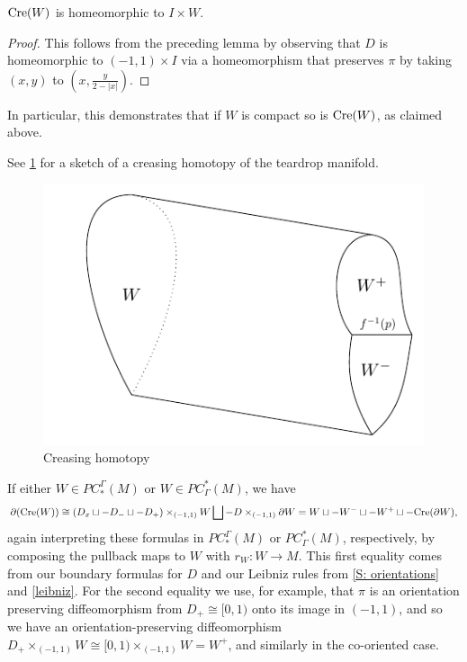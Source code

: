 \begin{corollary}
$\mathrm{Cre}(W)$ is homeomorphic to $I \times W$.
\end{corollary}
\begin{proof}
This follows from the preceding lemma by observing that $D$ is homeomorphic to $(-1,1) \times I$ via a homeomorphism that preserves $\pi$ by taking $(x,y)$ to $\left(x, \frac{y}{2-|x|}\right)$.
\end{proof}

In particular, this demonstrates that if $W$ is compact so is $\mathrm{Cre}(W)$, as claimed above.

See \cref{F: creasing} for a sketch of a creasing homotopy of the teardrop manifold.

\begin{figure}
	\includegraphics{figures/creasing2.pdf}
	\caption{Creasing homotopy}
	\label{F: creasing}
\end{figure}

If either $W \in PC^\Gamma_*(M)$ or $W \in PC_\Gamma^*(M)$, we have
\begin{equation}\label{E: bd crease}
\partial(\mathrm{Cre}(W))\cong(D_x \sqcup -D_- \sqcup -D_+)\times_{(-1,1)} W \bigsqcup -D\times_{(-1,1)}\partial W = W \sqcup -W^- \sqcup -W^+ \sqcup -\mathrm{Cre}(\partial W),
\end{equation}
again interpreting these formulas in $PC^\Gamma_*(M)$ or $PC_\Gamma^*(M)$, respectively, by composing the pullback maps to $W$ with $r_W \colon W \to M$. This first equality comes from our boundary formulas for $D$ and our Leibniz rules from \cref{S: orientations} and \cref{leibniz}. For the second equality we use, for example, that $\pi$ is an orientation preserving diffeomorphism from $D_+ \cong [0,1)$ onto its image in $(-1,1)$, and so we have an orientation-preserving diffeomorphism $D_+\times_{(-1,1)} W \cong [0,1)\times_{(-1,1)} W = W^+$, and similarly in the co-oriented case.

